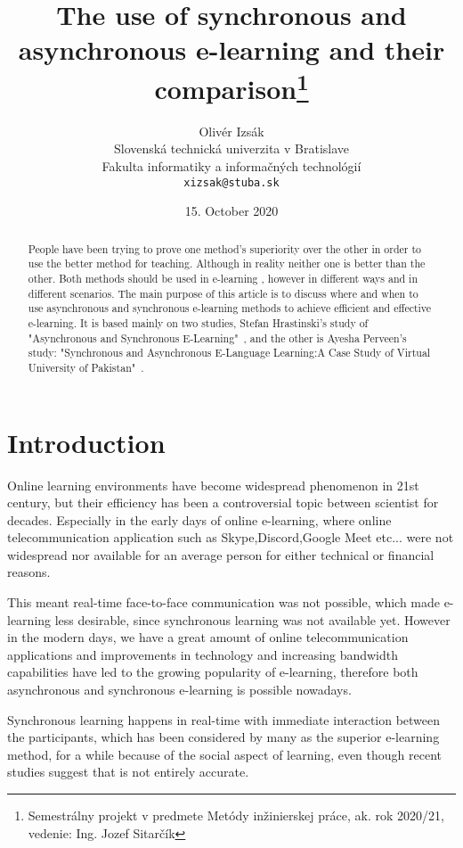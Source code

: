 \documentclass[10pt,twoside,english,a4paper]{article}
\title{The use of synchronous and asynchronous e-learning and their comparison\thanks{Semestrálny projekt v predmete Metódy inžinierskej práce, ak. rok 2020/21, vedenie: 	
Ing. Jozef Sitarčík}}
\author{Olivér Izsák\\[2pt]
	{\small Slovenská technická univerzita v Bratislave}\\
	{\small Fakulta informatiky a informačných technológií}\\
	{\small \texttt{xizsak@stuba.sk}}
	}
\date{\small 15. October 2020}
\begin{document}
\maketitle

\begin{abstract}

People have been trying to prove one method's superiority over the other in order to use the better method for teaching.
Although in reality neither one is better than the other. Both methods should be used in e-learning , however
in different ways  and in different scenarios. The main purpose of this article is to discuss  where and when to use asynchronous and
synchronous e-learning methods to achieve efficient and effective  e-learning. It is based mainly on two studies, Stefan Hrastinski's study of "Asynchronous and Synchronous E-Learning"~\cite{Hrastinski:E-learning}, and the other is Ayesha Perveen's study: "Synchronous and Asynchronous E-Language Learning:A Case Study of Virtual University of Pakistan"~\cite{Perveen:E-learning}.

\end{abstract}



\section{Introduction} \label{intro}

Online learning environments have become widespread phenomenon in 21st century, but their efficiency has been a controversial topic between scientist for decades. Especially in the early days of online e-learning, where online telecommunication application such as Skype,Discord,Google Meet etc... were not widespread nor available for an average person for either technical or financial reasons.

This meant real-time face-to-face communication was not possible, which made e-learning less desirable, since synchronous learning was not available yet. However in the modern days, we have a great amount of online telecommunication applications and improvements in technology and increasing bandwidth capabilities have led to the growing popularity of e-learning, therefore both asynchronous and synchronous e-learning is possible nowadays.

Synchronous learning happens in real-time with immediate interaction between the participants, which has been considered by many as the superior e-learning method, for a while because of the social aspect of learning, even though recent studies suggest that is not entirely accurate.
\end{document}
